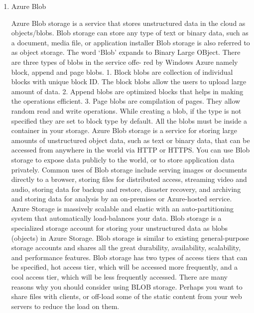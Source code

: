 \begin{enumerate}
\item {} 
Azure Blob

Azure Blob storage is a service that stores unstructured data in
the cloud as objects/blobs. Blob storage can store any type of
text or binary data, such as a document, media file, or
application installer \label{\detokenize{i524/technologies:id553}}{\hyperref[\detokenize{i524/technologies:www-azure-3}]{\sphinxcrossref{{[}474{]}}}} Blob storage is also
referred to as object storage. The word ‘Blob’ expands to Binary
Large OBject. There are three types of blobs in the service offe-
red by Windows Azure namely block, append and page
blobs. \label{\detokenize{i524/technologies:id554}}{\hyperref[\detokenize{i524/technologies:www-azure-2}]{\sphinxcrossref{{[}475{]}}}}
1. Block blobs are collection of individual blocks with unique
block ID.  The block blobs allow the users to upload large amount
of data.
2. Append blobs are optimized blocks that helps in making the
operations efficient.
3. Page blobs are compilation of pages. They allow random read
and write operations. While creating a blob, if the type is not
specified they are set to block type by default. All the blobs
must be inside a container in your storage.  Azure Blob storage
is a service for storing large amounts of unstructured object
data, such as text or binary data, that can be accessed from
anywhere in the world via HTTP or HTTPS. You can use Blob storage
to expose data publicly to the world, or to store application
data privately. Common uses of Blob storage include serving
images or documents directly to a browser, storing files for
distributed access, streaming video and audio, storing data for
backup and restore, disaster recovery, and archiving and storing
data for analysis by an on-premises or Azure-hosted service.
Azure Storage is massively scalable and elastic with an
auto-partitioning system that automatically load-balances your
data. Blob storage is a specialized storage account for storing
your unstructured data as blobs (objects) in Azure Storage. Blob
storage is similar to existing general-purpose storage accounts
and shares all the great durability, availability, scalability,
and performance features. Blob storage has two types of access
tiers that can be specified, hot access tier, which will be
accessed more frequently, and a cool access tier, which will be
less frequently accessed. There are many reasons why you should
consider using BLOB storage. Perhaps you want to share files with
clients, or off-load some of the static content from your web
servers to reduce the load on them. \label{\detokenize{i524/technologies:id555}}{\hyperref[\detokenize{i524/technologies:www-azure-3}]{\sphinxcrossref{{[}474{]}}}}


\end{enumerate}
